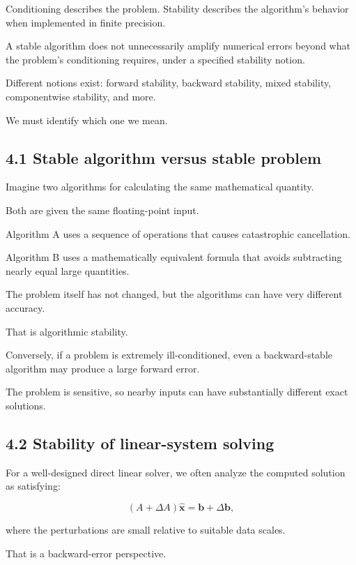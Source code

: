 Conditioning describes the problem. Stability describes the algorithm's behavior when implemented in finite precision.

A stable algorithm does not unnecessarily amplify numerical errors beyond what the problem's conditioning requires, under a specified stability notion.

Different notions exist: forward stability, backward stability, mixed stability, componentwise stability, and more.

We must identify which one we mean.

\subsection{4.1 Stable algorithm versus stable problem}\label{02-foundations-ii-ch028-stable-algorithm-versus-stable-problem}

Imagine two algorithms for calculating the same mathematical quantity.

Both are given the same floating-point input.

Algorithm A uses a sequence of operations that causes catastrophic cancellation.

Algorithm B uses a mathematically equivalent formula that avoids subtracting nearly equal large quantities.

The problem itself has not changed, but the algorithms can have very different accuracy.

That is algorithmic stability.

Conversely, if a problem is extremely ill-conditioned, even a backward-stable algorithm may produce a large forward error.

The problem is sensitive, so nearby inputs can have substantially different exact solutions.

\subsection{4.2 Stability of linear-system solving}\label{02-foundations-ii-ch028-stability-of-linear-system-solving}

For a well-designed direct linear solver, we often analyze the computed solution as satisfying:

\[ (A+\Delta A)\hat{\mathbf x} = \mathbf b+\Delta\mathbf b, \]

where the perturbations are small relative to suitable data scales.

That is a backward-error perspective.

